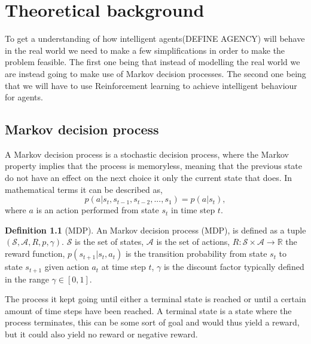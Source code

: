 \documentclass{report}
\theoremstyle{definition}
\newtheorem{definition}{Definition}[section]
\begin{document}





\chapter{Theoretical background}
To get a understanding of how intelligent agents(DEFINE AGENCY) will behave in the real world we need to make a few simplifications in order to make the problem feasible. The first one being that instead of modelling the real world we are instead going to make use of Markov decision processes. The second one being that we will have to use Reinforcement learning to achieve intelligent behaviour for agents. 

\section{Markov decision process}
A Markov decision process is a stochastic decision process, where the Markov property implies that the process is memoryless, meaning that the previous state do not have an effect on the next choice it only the current state that does. In mathematical terms it can be described as,
\[ p(a|s_t, s_{t-1}, s_{t-2}, ... , s_1) = p(a|s_t),\]
where $a$ is an action performed from state $s_t$ in time step $t$.

\begin{definition}[MDP]
    An Markov decision process (MDP), is defined as a tuple $(\mathcal{S}, \mathcal{A}, R, p, \gamma)$. $\mathcal{S}$ is the set of states, $\mathcal{A}$ is the set of actions, $R: \mathcal{S} \times \mathcal{A} \rightarrow \mathbb{R}$ the reward function, $p(s_{t+1}|s_t, a_t)$ is the transition probability from state $s_t$ to state $s_{t+1}$ given action $a_t$ at time step $t$, $\gamma$ is the discount factor typically defined in the range $\gamma \in [0, 1]$.
\end{definition}

The process it kept going until either a terminal state is reached or until a certain amount of time steps have been reached. A terminal state is a state where the process terminates, this can be some sort of goal and would thus yield a reward, but it could also yield no reward or negative reward.
\end{document}
